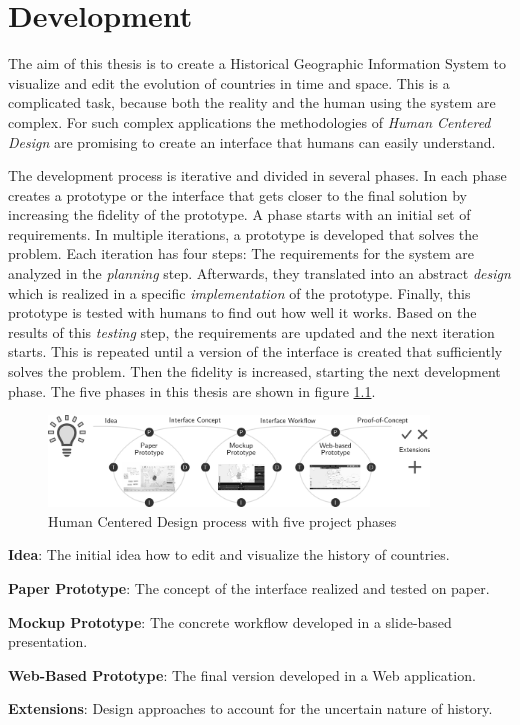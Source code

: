 
\chapter{Development} %
\label{cha:development}

The aim of this thesis is to create a Historical Geographic Information System to visualize and edit the evolution of countries in time and space. This is a complicated task, because both the reality and the human using the system are complex. For such complex applications the methodologies of \emph{Human Centered Design} are promising to create an interface that humans can easily understand.

The development process is iterative and divided in several phases. In each phase creates a prototype or the interface that gets closer to the final solution by increasing the fidelity of the prototype. A phase starts with an initial set of requirements. In multiple iterations, a prototype is developed that solves the problem. Each iteration has four steps: The requirements for the system are analyzed in the \emph{planning} step. Afterwards, they translated into an abstract \emph{design} which is realized in a specific \emph{implementation} of the prototype. Finally, this prototype is tested with humans to find out how well it works. Based on the results of this \emph{testing} step, the requirements are updated and the next iteration starts. This is repeated until a version of the interface is created that sufficiently solves the problem. Then the fidelity is increased, starting the next development phase. The five phases in this thesis are shown in figure \ref{fig:human_centered_design}.

\begin{figure}[H]
  \vspace{1em}
  \centering
  \includegraphics[width=0.9\textwidth]{graphics/development/human_centered_design}
  \caption{Human Centered Design process with five project phases}
  \label{fig:human_centered_design}
\end{figure}

\newpage
\begin{compactenum}
  \item \textbf{Idea}: The initial idea how to edit and visualize the history of countries.
  \item \textbf{Paper Prototype}: The concept of the interface realized and tested on paper.
  \item \textbf{Mockup Prototype}: The concrete workflow developed in a slide-based presentation.
  \item \textbf{Web-Based Prototype}: The final version developed in a Web application.
  \item \textbf{Extensions}: Design approaches to account for the uncertain nature of history.
\end{compactenum}

